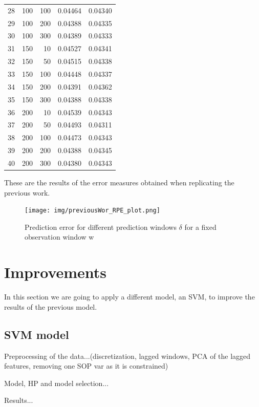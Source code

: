 \documentclass[a4paper]{article}
\begin{document}
\begin{table}[!h]
\begin{tabular}{rrrrr}
  28 & 100 & 100 & 0.04464 & 0.04340 \\ 
  29 & 100 & 200 & 0.04388 & 0.04335 \\ 
  30 & 100 & 300 & 0.04389 & 0.04333 \\ 
  31 & 150 & 10 & 0.04527 & 0.04341 \\ 
  32 & 150 & 50 & 0.04515 & 0.04338 \\ 
  33 & 150 & 100 & 0.04448 & 0.04337 \\ 
  34 & 150 & 200 & 0.04391 & 0.04362 \\ 
  35 & 150 & 300 & 0.04388 & 0.04338 \\ 
  36 & 200 & 10 & 0.04539 & 0.04343 \\ 
  37 & 200 & 50 & 0.04493 & 0.04311 \\ 
  38 & 200 & 100 & 0.04473 & 0.04343 \\ 
  39 & 200 & 200 & 0.04388 & 0.04345 \\ 
  40 & 200 & 300 & 0.04380 & 0.04343 \\ 
   \hline
\end{tabular}
\end{table}



These are the results of the error measures obtained when replicating the previous work.

\begin{figure}[H]
    \centering
    \texttt{[image: img/previousWor\_RPE\_plot.png]}
    \caption{Prediction error for different prediction windows $\delta$ for a fixed observation window w}
    \label{previous2}
\end{figure}


\section{Improvements}

In this section we are going to apply a different model, an SVM, to improve the results of the previous model.

\subsection{SVM model}

Preprocessing of the data...(discretization, lagged windows, PCA of the lagged features, removing one SOP var as it is constrained)

Model, HP and model selection...


Results...
\end{document}
